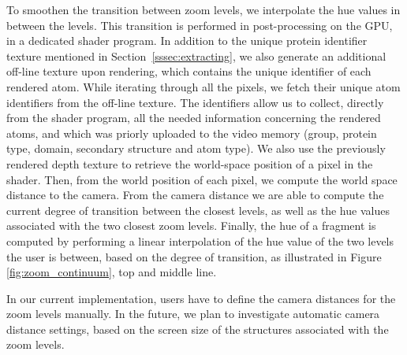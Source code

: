 \documentclass{egpubl}
\begin{document}
	
	To smoothen the transition between zoom levels, we interpolate the hue values in between the levels.	
	This transition is performed in post-processing on the GPU, in a dedicated shader program.
	In addition to the unique protein identifier texture mentioned in Section~\ref{sssec:extracting}, we also generate an additional off-line texture upon rendering, which contains the unique identifier of each rendered atom.
	While iterating through all the pixels, we fetch their unique atom identifiers from the off-line texture.
	The identifiers allow us to collect, directly from the shader program, all the needed information concerning the rendered atoms, and which was priorly uploaded to the video memory (group, protein type, domain, secondary structure and atom type).	
	We also use the previously rendered depth texture to retrieve the world-space position of a pixel in the shader.
	Then, from the world position of each pixel, we compute the world space distance to the camera.
	From the camera distance we are able to compute the current degree of transition between the closest levels, as well as the hue values associated with the two closest zoom levels.	
	Finally, the hue of a fragment is computed by performing a linear interpolation of the hue value of the two levels the user is between, based on the degree of transition, as illustrated in Figure \ref{fig:zoom_continuum}, top and middle line.
	
	In our current implementation, users have to define the camera distances for the zoom levels manually. 
	In the future, we plan to investigate automatic camera distance settings, based on the screen size of the structures associated with the zoom levels.
	
\end{document}
